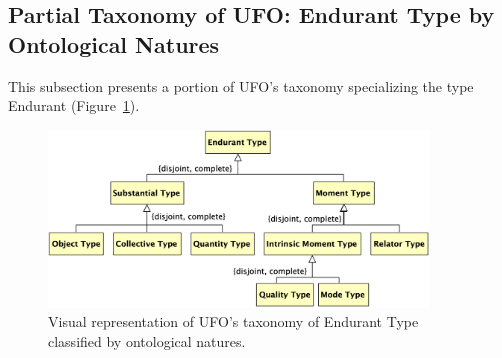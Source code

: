 \documentclass{article}
\newcommand{\me}[1]{\textsf{#1}}
\begin{document}
\subsection{Partial Taxonomy of UFO: \me{Endurant Type} by Ontological Natures}

This subsection presents a portion of UFO's taxonomy specializing the type \me{Endurant} (Figure~\ref{fig:04_taxonomy_endurant_type_nature}).

\begin{figure}[ht]
    \centering
    \includegraphics[width=0.9\textwidth]{diagrams/Endurant_Type_Natures_Diagram.png}
    \caption{Visual representation of UFO's taxonomy of \me{Endurant Type} classified by ontological natures.}
    \label{fig:04_taxonomy_endurant_type_nature}
\end{figure}
\end{document}
